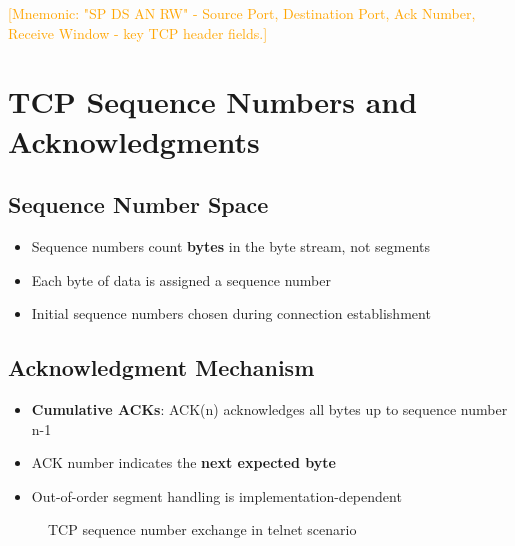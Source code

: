 \documentclass[12pt]{article}
\begin{document}
\textcolor{orange}{[Mnemonic: "SP DS AN RW" - Source Port, Destination Port, Ack Number, Receive Window - key TCP header fields.]}

\section{TCP Sequence Numbers and Acknowledgments}

\subsection{Sequence Number Space}
\begin{itemize}
    \item Sequence numbers count \textbf{bytes} in the byte stream, not segments
    \item Each byte of data is assigned a sequence number
    \item Initial sequence numbers chosen during connection establishment
\end{itemize}

\subsection{Acknowledgment Mechanism}
\begin{itemize}
    \item \textbf{Cumulative ACKs}: ACK(n) acknowledges all bytes up to sequence number n-1
    \item ACK number indicates the \textbf{next expected byte}
    \item Out-of-order segment handling is implementation-dependent
\end{itemize}

\begin{figure}[h]
    \centering
    \caption{TCP sequence number exchange in telnet scenario}
    \label{fig:tcp_sequence_example}
\end{figure}
\end{document}
